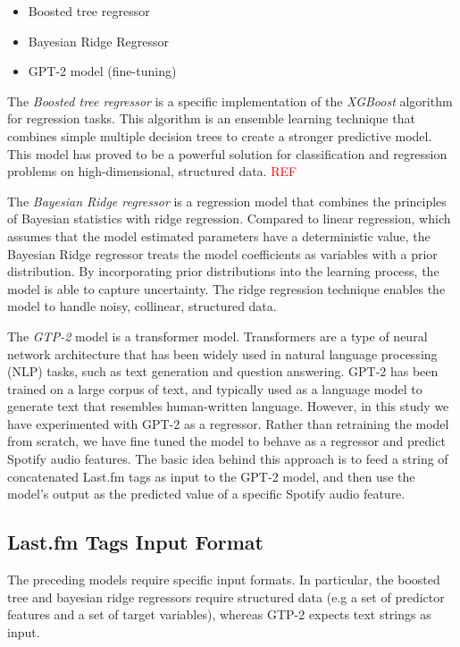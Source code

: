 \documentclass[sn-mathphys]{sn-jnl}%
\theoremstyle{thmstyleone}%
\theoremstyle{thmstyletwo}%
\theoremstyle{thmstylethree}%
\begin{document}
\begin{itemize}
      \item Boosted tree regressor \cite{xgboost}
      \item Bayesian Ridge Regressor \cite{bayesian}
      \item GPT-2 model (fine-tuning) \cite{radford2019language}
\end{itemize}


The \emph{Boosted tree regressor} is a specific implementation of the \emph{XGBoost} algorithm for regression tasks.
This algorithm is an ensemble learning technique that combines simple multiple decision trees to
create a stronger predictive model.
This model has proved to be a powerful solution for classification and regression problems on high-dimensional, structured data.
\textcolor{red}{REF}

The \emph{Bayesian Ridge regressor} is a regression model that combines the principles of Bayesian statistics with ridge regression.
Compared to linear regression, which assumes that the model estimated parameters have a deterministic value, the Bayesian Ridge regressor treats the model coefficients as variables with a prior distribution.
By incorporating prior distributions into the learning process, the model is able to capture uncertainty.
The ridge regression technique enables the model to handle noisy, collinear, structured data.

The \emph{GTP-2} model is a transformer model.
Transformers are a type of neural network architecture that has been widely used in natural language processing (NLP) tasks,
such as text generation and question answering.
GPT-2 has been trained on a large corpus of text, and typically used as a language model to generate text that resembles human-written language.
However, in this study we have experimented with GPT-2 as a regressor.
Rather than retraining the model from scratch, we have fine tuned the model to behave as a regressor and  predict Spotify audio features.
The basic idea behind this approach is to feed a string of concatenated Last.fm tags as input to the GPT-2 model, and then use the model's output as the predicted value of a specific Spotify audio feature.


\subsection{Last.fm Tags Input Format}

The preceding models require specific input formats.
In particular, the boosted tree and bayesian ridge regressors require structured data (e.g a set of predictor features and a set of target variables), whereas GTP-2 expects text strings as input.
\end{document}
